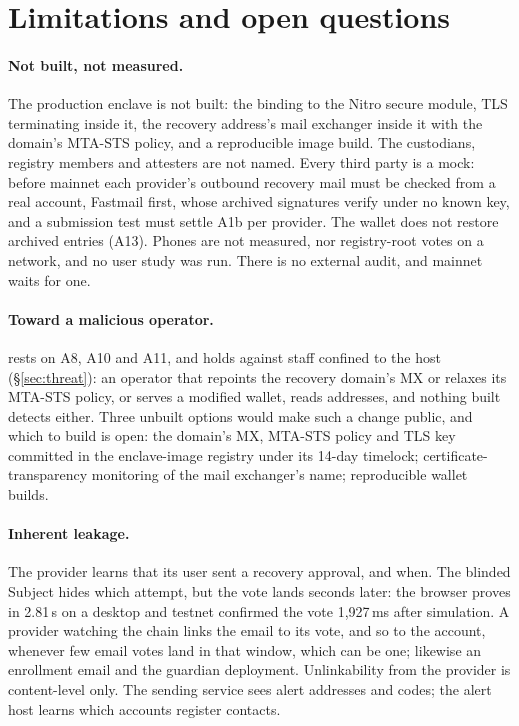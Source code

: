 \section{Limitations and open questions}\label{sec:limits}

\paragraph{Not built, not measured.} The production enclave is not built:
the binding to the Nitro secure module, TLS terminating inside it, the
recovery address's mail exchanger inside it with the domain's MTA-STS
policy, and a reproducible image build. The custodians, registry members and
attesters are not named. Every third party is a mock: before mainnet each
provider's outbound recovery mail must be checked from a real account,
Fastmail first, whose archived signatures verify under no known key, and a
submission test must settle A1b per provider. The wallet does not restore archived entries (A13). Phones are not
measured, nor registry-root votes on a network,
and no user study was run. There is no external audit, and mainnet waits for
one.

\paragraph{Toward a malicious operator.} \PrivacyClaim{} rests on A8, A10 and
A11, and holds against staff confined to the host (\S\ref{sec:threat}): an
operator that repoints the recovery domain's MX or relaxes its MTA-STS
policy, or serves a modified wallet, reads addresses, and nothing built
detects either. Three
unbuilt options would make such a change public, and which to build is
open: the domain's MX, MTA-STS policy and TLS key committed in the
enclave-image registry under its 14-day timelock; certificate-transparency
monitoring of the mail exchanger's name; reproducible wallet builds.

\paragraph{Inherent leakage.} The provider learns that its user sent a
recovery approval, and when. The blinded Subject hides which attempt, but
the vote lands seconds later: the browser proves in 2.81\,s on a desktop and
testnet confirmed the vote 1{,}927\,ms after
simulation. A provider
watching the chain links the email to its vote, and so to the account,
whenever few email votes land in that window, which can be one; likewise an
enrollment email and the guardian deployment. Unlinkability from the
provider is content-level only. The sending service sees alert addresses and
codes; the alert host learns which accounts register contacts.


